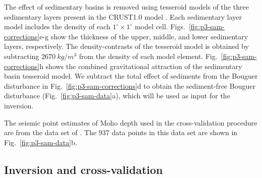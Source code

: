 The effect of sedimentary basins is removed using
tesseroid models of the three sedimentary layers present in the CRUST1.0 model
\citep[][ \url{http://igppweb.ucsd.edu/~gabi/rem.html}]{laske2013}.
Each sedimentary layer model includes the density
of each $1^\circ \times 1^\circ$ model cell.
Figs.~\ref{fig:p3-sam-corrections}e-g show the thickness of the upper, middle, and
lower sedimentary layers, respectively.
The density-contrasts of the tesseroid model is obtained by subtracting
$2670\ kg/m^3$ from the density of each model element.
Fig.~\ref{fig:p3-sam-corrections}h shows the combined gravitational attraction of
the sedimentary basin tesseroid model.
We subtract the total effect of sediments from the Bouguer disturbance in
Fig.~\ref{fig:p3-sam-corrections}d to obtain
the sediment-free Bouguer disturbance (Fig.~\ref{fig:p3-sam-data}a),
which will be used as input for the inversion.

The seismic point estimates of Moho depth used in the cross-validation
procedure are from the data set of \citet{assumpcao2013a}.
The 937 data points in this data set are shown in Fig.~\ref{fig:p3-sam-data}b.


\subsection{Inversion and cross-validation}

